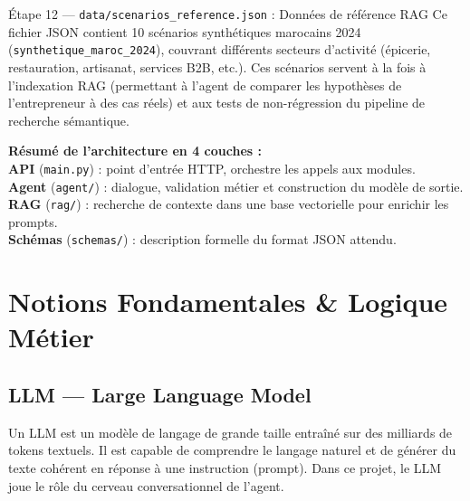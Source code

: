 \documentclass[12pt, a4paper]{report}
\begin{document}
\bigskip

\begin{stepbox}{Étape 12 — \texttt{data/scenarios\_reference.json} : Données de référence RAG}
Ce fichier JSON contient 10 scénarios synthétiques marocains 2024 (\texttt{synthetique\_maroc\_2024}), couvrant différents secteurs d'activité (épicerie, restauration, artisanat, services B2B, etc.). Ces scénarios servent à la fois à l'indexation RAG (permettant à l'agent de comparer les hypothèses de l'entrepreneur à des cas réels) et aux tests de non-régression du pipeline de recherche sémantique.
\end{stepbox}

\vspace{12pt}
\begin{resultbox}
\textbf{\color{darkgreen} Résumé de l'architecture en 4 couches :}\\
\textbf{API} (\texttt{main.py}) : point d'entrée HTTP, orchestre les appels aux modules.\\
\textbf{Agent} (\texttt{agent/}) : dialogue, validation métier et construction du modèle de sortie.\\
\textbf{RAG} (\texttt{rag/}) : recherche de contexte dans une base vectorielle pour enrichir les prompts.\\
\textbf{Schémas} (\texttt{schemas/}) : description formelle du format JSON attendu.
\end{resultbox}

\chapter{Notions Fondamentales \& Logique Métier}

\section{LLM — Large Language Model}

Un LLM est un modèle de langage de grande taille entraîné sur des milliards de tokens textuels. Il est capable de comprendre le langage naturel et de générer du texte cohérent en réponse à une instruction (prompt). Dans ce projet, le LLM joue le rôle du cerveau conversationnel de l'agent.
\end{document}
